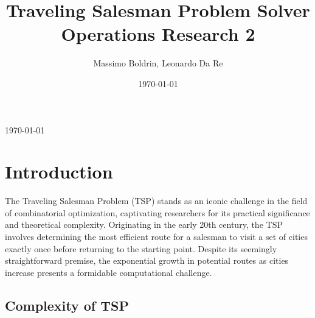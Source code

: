 \documentclass[a4paper]{article}
\begin{document}
\begin{titlepage}
	
	\vfill\vfill\vfill %
	
	{\large\today} %
	
	
	 
	
	\vfill %
	
\end{titlepage}


\title{Traveling Salesman Problem Solver \\ Operations Research 2} %

\author{Massimo Boldrin, Leonardo Da Re}

\date{\today}




\section{Introduction}

The Traveling Salesman Problem (TSP) stands as an iconic challenge in the field of combinatorial optimization, captivating researchers for its practical significance and theoretical complexity. Originating in the early 20th century, the TSP involves determining the most efficient route for a salesman to visit a set of cities exactly once before returning to the starting point. Despite its seemingly straightforward premise, the exponential growth in potential routes as cities increase presents a formidable computational challenge.

\subsection[short]{Complexity of TSP}
\end{document}
